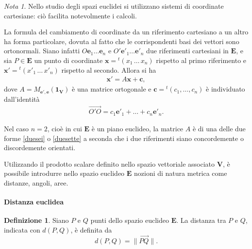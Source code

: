 \documentclass{article}
\theoremstyle{plain}
\theoremstyle{definition}
\newtheorem{defn}{Definizione}[section]
\theoremstyle{remark}
\newtheorem{note}{Nota}
\begin{document}
\vspace{10pt}

\begin{note}
Nello studio degli spazi euclidei si utilizzano sistemi di coordinate cartesiane: ciò facilita notevolmente i calcoli.    
\end{note}

\vspace{10pt}

La formula del cambiamento di coordinate da un riferimento cartesiano a un altro ha forma particolare, 
dovuta al fatto che le corrispondenti basi dei vettori sono ortonormali. Siano infatti $O\mathbf{e}_1 \ldots \mathbf{e}_n$ 
e $O'\mathbf{e}'_1 \ldots \mathbf{e}'_n$ due riferimenti cartesiani in $\mathbf{E}$, e sia $P \in \mathbf{E}$ un punto di coordinate 
$\mathbf{x} = {}^t(x_1\, \ldots\, x_n)$ rispetto al primo riferimento e $\mathbf{x}' = {}^t(x'_1\, \ldots\, x'_n)$ rispetto al secondo.
Allora si ha
\begin{align}
\mathbf{x}' = A\mathbf{x} + \mathbf{c},
\end{align}
dove $A = M_{\mathbf{e}',\mathbf{e}}(\mathbf{1_V})$ è una matrice ortogonale e $\mathbf{c} = {}^t(c_1, \ldots, c_n)$ è 
individuato dall'identità
\begin{align}
\overrightarrow{O'O} = c_1\mathbf{e}'_1 + \ldots + c_n\mathbf{e}'_n.
\end{align}

\vspace{10pt}

Nel caso $n = 2$, cioè in cui $\mathbf{E}$ è un piano euclideo, la matrice $A$ è di una delle
due forme \ref{duesei} o \ref{duesette} a seconda che i due riferimenti siano concordemente o discordemente orientati.

\vspace{10pt}

Utilizzando il prodotto scalare definito nello spazio vettoriale associato $\mathbf{V}$, è possibile introdurre nello spazio 
euclideo $\mathbf{E}$ nozioni di natura metrica come distanze, angoli, aree.

\vspace{10pt}

\paragraph{Distanza euclidea}
\begin{bxthm}
\begin{defn}\label{diciannoveuno}
Siano $P$ e $Q$ punti dello spazio euclideo $\mathbf{E}$. La distanza tra $P$ e $Q$, indicata con $d(P, Q)$, è definita da
\[
d(P, Q) = \|\overrightarrow{PQ}\|.
\]    
\end{defn}
\end{bxthm}
\end{document}
